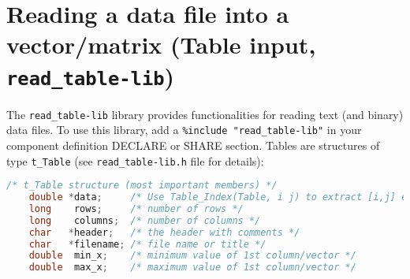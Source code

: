 \section{Reading a data file into a vector/matrix (Table input, \texttt{read\_table-lib})}
\label{s:read-table}
  The \verb+read_table-lib+ library provides functionalities for reading text
  (and binary) data files. To use this library,
  add a \verb+%include "read_table-lib"+ in your component definition
  DECLARE or SHARE section. Tables are structures of type \verb+t_Table+
  (see \verb+read_table-lib.h+ file for details):
  \begin{lstlisting}[language=C]
    /* t_Table structure (most important members) */
    double *data;     /* Use Table_Index(Table, i j) to extract [i,j] element */
    long    rows;     /* number of rows */
    long    columns;  /* number of columns */
    char   *header;   /* the header with comments */
    char   *filename; /* file name or title */
    double  min_x;    /* minimum value of 1st column/vector */
    double  max_x;    /* maximum value of 1st column/vector */
\end{lstlisting}

